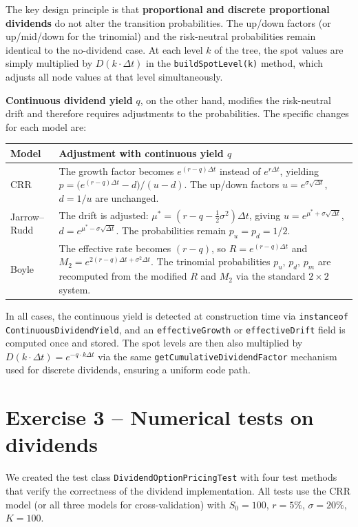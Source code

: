 \documentclass[11pt,a4paper]{article}
\begin{document}
The key design principle is that \textbf{proportional and discrete proportional dividends} do not alter the transition probabilities. The up/down factors (or up/mid/down for the trinomial) and the risk-neutral probabilities remain identical to the no-dividend case. At each level $k$ of the tree, the spot values are simply multiplied by $D(k \cdot \Delta t)$ in the \texttt{buildSpotLevel(k)} method, which adjusts all node values at that level simultaneously.

\textbf{Continuous dividend yield} $q$, on the other hand, modifies the risk-neutral drift and therefore requires adjustments to the probabilities. The specific changes for each model are:

\smallskip
\begin{tabular}{@{}lp{10.5cm}@{}}
\toprule
\textbf{Model} & \textbf{Adjustment with continuous yield $q$} \\
\midrule
CRR & The growth factor becomes $e^{(r-q)\Delta t}$ instead of $e^{r\Delta t}$, yielding $p = \bigl(e^{(r-q)\Delta t}-d\bigr)/(u-d)$. The up/down factors $u = e^{\sigma\sqrt{\Delta t}}$, $d=1/u$ are unchanged. \\[4pt]
Jarrow--Rudd & The drift is adjusted: $\mu^*=(r-q-\tfrac{1}{2}\sigma^2)\Delta t$, giving $u=e^{\mu^*+\sigma\sqrt{\Delta t}}$, $d=e^{\mu^*-\sigma\sqrt{\Delta t}}$. The probabilities remain $p_u = p_d = 1/2$. \\[4pt]
Boyle & The effective rate becomes $(r-q)$, so $R=e^{(r-q)\Delta t}$ and $M_2=e^{2(r-q)\Delta t+\sigma^2\Delta t}$. The trinomial probabilities $p_u$, $p_d$, $p_m$ are recomputed from the modified $R$ and $M_2$ via the standard $2\times 2$ system. \\
\bottomrule
\end{tabular}
\smallskip

In all cases, the continuous yield is detected at construction time via \texttt{instanceof ContinuousDividendYield}, and an \texttt{effectiveGrowth} or \texttt{effectiveDrift} field is computed once and stored. The spot levels are then also multiplied by $D(k\cdot\Delta t) = e^{-q \cdot k\Delta t}$ via the same \texttt{getCumulativeDividendFactor} mechanism used for discrete dividends, ensuring a uniform code path.

\section{Exercise 3 -- Numerical tests on dividends}

We created the test class \texttt{DividendOptionPricingTest} with four test methods that verify the correctness of the dividend implementation. All tests use the CRR model (or all three models for cross-validation) with $S_0=100$, $r=5\%$, $\sigma=20\%$, $K=100$.
\end{document}

